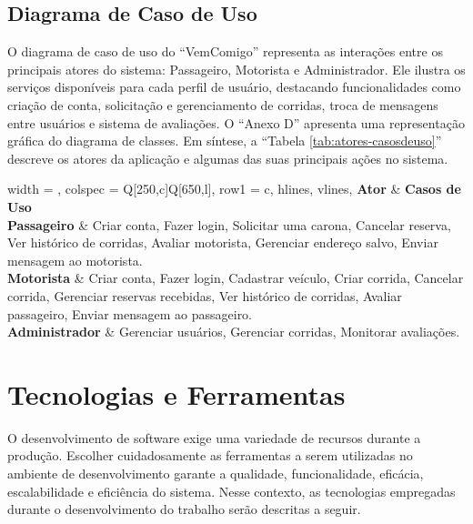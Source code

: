 \subsection{Diagrama de Caso de Uso}

O diagrama de caso de uso do ``VemComigo'' representa as interações entre os principais atores do sistema: Passageiro, Motorista e Administrador. Ele ilustra os serviços disponíveis para cada perfil de usuário, destacando funcionalidades como criação de conta, solicitação e gerenciamento de corridas, troca de mensagens entre usuários e sistema de avaliações.  O ``Anexo D'' apresenta uma representação gráfica do diagrama de classes. Em síntese, a ``Tabela \ref{tab:atores-casosdeuso}'' descreve os atores da aplicação e algumas das suas principais ações no sistema.

\begin{longtblr}[
	caption = {Atores e Casos de Uso do Aplicativo},
	label = {tab:atores-casosdeuso},
	entry = none,
	]{
		width = \linewidth,
		colspec = {Q[250,c]Q[650,l]},
		row{1} = {c},
		hlines,
		vlines,
	}
	\textbf{Ator} & \textbf{Casos de Uso} \\
	
	\textbf{Passageiro} & 
	Criar conta, Fazer login, Solicitar uma carona, Cancelar reserva, Ver histórico de corridas, Avaliar motorista, Gerenciar endereço salvo, Enviar mensagem ao motorista. \\
	
	\textbf{Motorista} & 
	Criar conta, Fazer login, Cadastrar veículo, Criar corrida, Cancelar corrida, Gerenciar reservas recebidas, Ver histórico de corridas, Avaliar passageiro, Enviar mensagem ao passageiro. \\
	
	\textbf{Administrador} & 
	Gerenciar usuários, Gerenciar corridas, Monitorar avaliações. \\
	
\end{longtblr}

\section{Tecnologias e Ferramentas}

O desenvolvimento de software exige uma variedade de recursos durante a produção. Escolher cuidadosamente as ferramentas a serem utilizadas no ambiente de desenvolvimento garante a qualidade, funcionalidade, eficácia, escalabilidade e eficiência do sistema. Nesse contexto, as tecnologias empregadas durante o desenvolvimento do trabalho serão descritas a seguir. 


